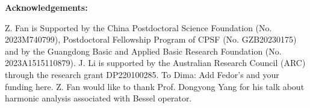 \documentclass[12pt]{amsart}
\begin{document}
%	
%	
%
%	
%
%	
%	
%
%	
%	
%
%	
%	
%	
%
%	
%
%	
%
%	
 {\bf Acknowledgements:}


Z. Fan is Supported by the China Postdoctoral Science Foundation (No. 2023M740799), Postdoctoral Fellowship Program of CPSF (No. GZB20230175) and by the Guangdong Basic and Applied Basic Research Foundation (No. 2023A1515110879). J. Li is supported by the Australian Research Council (ARC) through the research grant DP220100285. {\color{red}To Dima: Add Fedor's and your funding here.} Z. Fan would like to thank Prof. Dongyong Yang for his talk about harmonic analysis associated with Bessel operator.



\end{document}

